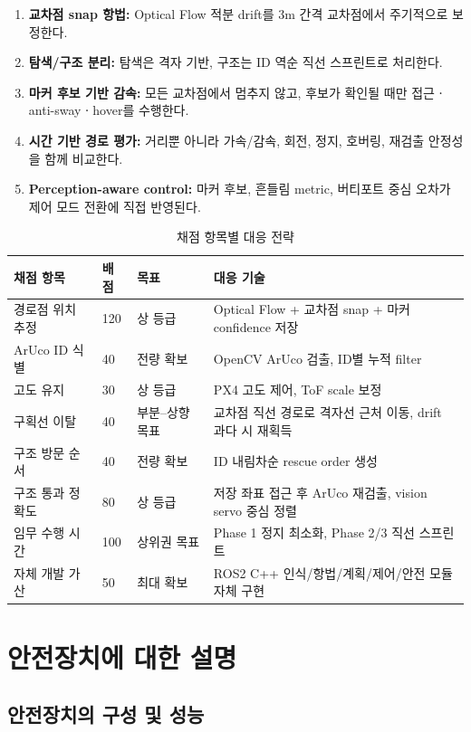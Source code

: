 \documentclass[10pt,a4paper]{article}
\begin{document}
\begin{enumerate}
\item \textbf{교차점 snap 항법:} Optical Flow 적분 drift를 3m 간격 교차점에서 주기적으로 보정한다.
\item \textbf{탐색/구조 분리:} 탐색은 격자 기반, 구조는 ID 역순 직선 스프린트로 처리한다.
\item \textbf{마커 후보 기반 감속:} 모든 교차점에서 멈추지 않고, 후보가 확인될 때만 접근ㆍanti-swayㆍhover를 수행한다.
\item \textbf{시간 기반 경로 평가:} 거리뿐 아니라 가속/감속, 회전, 정지, 호버링, 재검출 안정성을 함께 비교한다.
\item \textbf{Perception-aware control:} 마커 후보, 흔들림 metric, 버티포트 중심 오차가 제어 모드 전환에 직접 반영된다.
\end{enumerate}

\begin{table}[H]
\centering
\small
\caption{채점 항목별 대응 전략}
\begin{tabularx}{\linewidth}{p{31mm}p{16mm}p{22mm}Y}
\toprule
\textbf{채점 항목} & \textbf{배점} & \textbf{목표} & \textbf{대응 기술}\\
\midrule
경로점 위치 추정 & 120 & 상 등급 & Optical Flow + 교차점 snap + 마커 confidence 저장\\
ArUco ID 식별 & 40 & 전량 확보 & OpenCV ArUco 검출, ID별 누적 filter\\
고도 유지 & 30 & 상 등급 & PX4 고도 제어, ToF scale 보정\\
구획선 이탈 & 40 & 부분--상향 목표 & 교차점 직선 경로로 격자선 근처 이동, drift 과다 시 재획득\\
구조 방문 순서 & 40 & 전량 확보 & ID 내림차순 rescue order 생성\\
구조 통과 정확도 & 80 & 상 등급 & 저장 좌표 접근 후 ArUco 재검출, vision servo 중심 정렬\\
임무 수행 시간 & 100 & 상위권 목표 & Phase 1 정지 최소화, Phase 2/3 직선 스프린트\\
자체 개발 가산 & 50 & 최대 확보 & ROS2 C++ 인식/항법/계획/제어/안전 모듈 자체 구현\\
\bottomrule
\end{tabularx}
\end{table}

\section{안전장치에 대한 설명}
\subsection{안전장치의 구성 및 성능}
\end{document}
